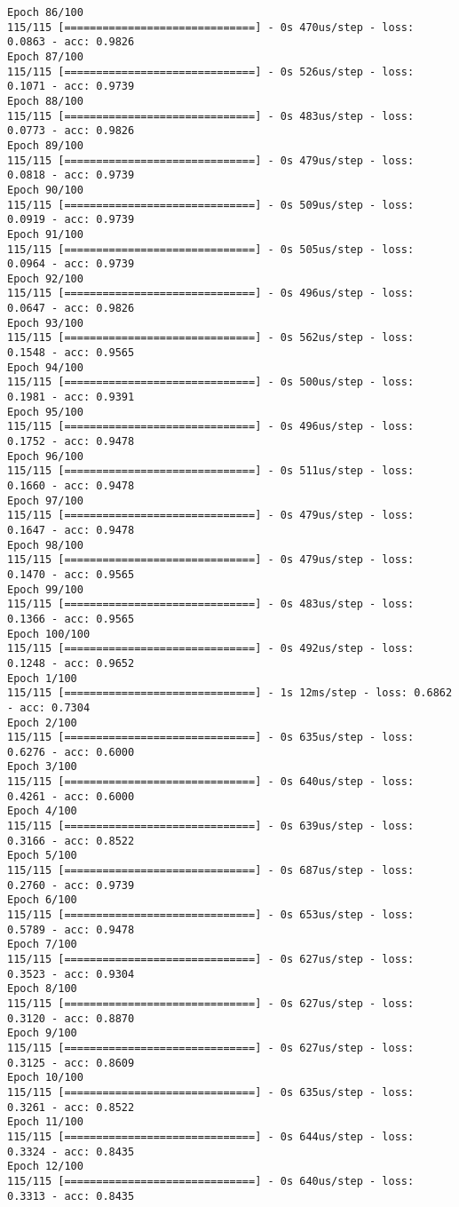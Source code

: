 \documentclass[11pt]{article}
\begin{document}
\begin{Verbatim}[commandchars=\\\{\}]
Epoch 86/100
115/115 [==============================] - 0s 470us/step - loss: 0.0863 - acc: 0.9826
Epoch 87/100
115/115 [==============================] - 0s 526us/step - loss: 0.1071 - acc: 0.9739
Epoch 88/100
115/115 [==============================] - 0s 483us/step - loss: 0.0773 - acc: 0.9826
Epoch 89/100
115/115 [==============================] - 0s 479us/step - loss: 0.0818 - acc: 0.9739
Epoch 90/100
115/115 [==============================] - 0s 509us/step - loss: 0.0919 - acc: 0.9739
Epoch 91/100
115/115 [==============================] - 0s 505us/step - loss: 0.0964 - acc: 0.9739
Epoch 92/100
115/115 [==============================] - 0s 496us/step - loss: 0.0647 - acc: 0.9826
Epoch 93/100
115/115 [==============================] - 0s 562us/step - loss: 0.1548 - acc: 0.9565
Epoch 94/100
115/115 [==============================] - 0s 500us/step - loss: 0.1981 - acc: 0.9391
Epoch 95/100
115/115 [==============================] - 0s 496us/step - loss: 0.1752 - acc: 0.9478
Epoch 96/100
115/115 [==============================] - 0s 511us/step - loss: 0.1660 - acc: 0.9478
Epoch 97/100
115/115 [==============================] - 0s 479us/step - loss: 0.1647 - acc: 0.9478
Epoch 98/100
115/115 [==============================] - 0s 479us/step - loss: 0.1470 - acc: 0.9565
Epoch 99/100
115/115 [==============================] - 0s 483us/step - loss: 0.1366 - acc: 0.9565
Epoch 100/100
115/115 [==============================] - 0s 492us/step - loss: 0.1248 - acc: 0.9652
Epoch 1/100
115/115 [==============================] - 1s 12ms/step - loss: 0.6862 - acc: 0.7304
Epoch 2/100
115/115 [==============================] - 0s 635us/step - loss: 0.6276 - acc: 0.6000
Epoch 3/100
115/115 [==============================] - 0s 640us/step - loss: 0.4261 - acc: 0.6000
Epoch 4/100
115/115 [==============================] - 0s 639us/step - loss: 0.3166 - acc: 0.8522
Epoch 5/100
115/115 [==============================] - 0s 687us/step - loss: 0.2760 - acc: 0.9739
Epoch 6/100
115/115 [==============================] - 0s 653us/step - loss: 0.5789 - acc: 0.9478
Epoch 7/100
115/115 [==============================] - 0s 627us/step - loss: 0.3523 - acc: 0.9304
Epoch 8/100
115/115 [==============================] - 0s 627us/step - loss: 0.3120 - acc: 0.8870
Epoch 9/100
115/115 [==============================] - 0s 627us/step - loss: 0.3125 - acc: 0.8609
Epoch 10/100
115/115 [==============================] - 0s 635us/step - loss: 0.3261 - acc: 0.8522
Epoch 11/100
115/115 [==============================] - 0s 644us/step - loss: 0.3324 - acc: 0.8435
Epoch 12/100
115/115 [==============================] - 0s 640us/step - loss: 0.3313 - acc: 0.8435

\end{Verbatim}
\end{document}
